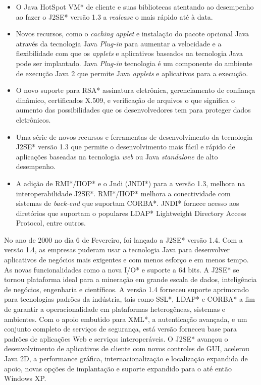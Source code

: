 	\begin{itemize}
	  \item O Java HotSpot VM* de cliente e suas bibliotecas atentando ao desempenho ao fazer o J2SE* versão 1.3 a {\it realease} o mais rápido até à data.
	  \item Novos recursos, como o {\it caching applet} e instalação do pacote opcional Java através da tecnologia Java {\it  Plug-in} para aumentar a velocidade e a flexibilidade com que os {\it applets} e aplicativos baseados na tecnologia Java pode ser implantado. Java {\it  Plug-in} tecnologia é um componente do ambiente de execução Java 2 que permite Java {\it applets} e aplicativos para a execução.
	  \item O novo suporte para RSA* assinatura eletrônica, gerenciamento de confiança dinâmico, certificados X.509, e verificação de arquivos o que significa o aumento das possibilidades que os desenvolvedores tem para proteger dados eletrônicos.
	  \item Uma série de novos recursos e ferramentas de desenvolvimento da tecnologia J2SE* versão 1.3 que permite o desenvolvimento mais fácil e rápido de aplicações baseadas na tecnologia {\it web} ou Java {\it  standalone} de alto desempenho.
	  \item A adição de RMI*/IIOP* e o Jndi (JNDI*) para a versão 1.3, melhora na interoperabilidade J2SE*. RMI*/IIOP* melhora a conectividade com sistemas de {\it  back-end} que suportam CORBA*. JNDI* fornece acesso aos diretórios que suportam o populares LDAP* Lightweight Directory Access Protocol, entre outros.\\
	\end{itemize}

	No ano de 2000 no dia 6 de Fevereiro, foi lançado a J2SE* versão 1.4. Com a versão 1.4, as empresas puderam usar a tecnologia Java para desenvolver aplicativos de negócios mais exigentes e com menos esforço e em menos tempo. As novas funcionalidades como a nova I/O* e suporte a 64 bits. A J2SE* se tornou plataforma ideal para a mineração em grande escala de dados, inteligência de negócios, engenharia e científicos. A versão 1.4 forneceu suporte aprimorado para tecnologias padrões da indústria, tais como SSL*, LDAP* e CORBA* a fim de garantir a operacionalidade em plataformas heterogêneas, sistemas e ambientes. Com o apoio embutido para XML*, a autenticação avançada, e um conjunto completo de serviços de segurança, está versão forneceu base para padrões de aplicações Web e serviços interoperáveis. O J2SE* avançou o desenvolvimento de aplicativos de cliente com novos controles de GUI, acelerou Java 2D, a performance gráfica, internacionalização e localização expandida de apoio, novas opções de implantação e suporte expandido para o até então Windows XP.\\

